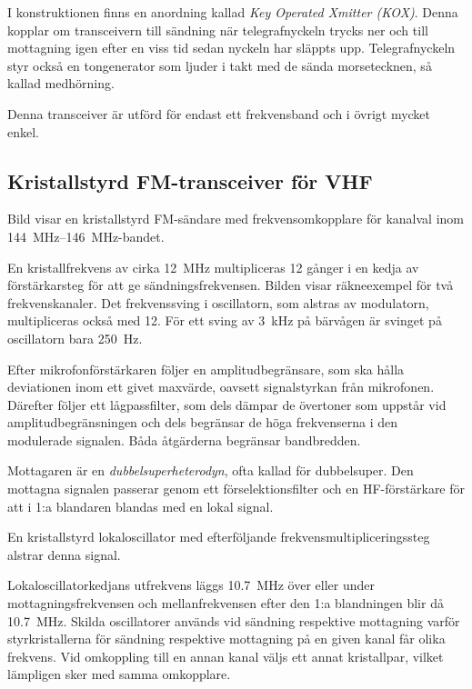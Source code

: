 I konstruktionen finns en anordning kallad \emph{Key Operated Xmitter (KOX)}.
Denna kopplar om transceivern till sändning när telegrafnyckeln trycks ner och
till mottagning igen efter en viss tid sedan nyckeln har släppts upp.
Telegrafnyckeln styr också en tongenerator som ljuder i takt med de sända
morsetecknen, så kallad medhörning.

Denna transceiver är utförd för endast ett frekvensband och i övrigt
mycket enkel.

\subsection{Kristallstyrd FM-transceiver för VHF}

Bild  visar en kristallstyrd FM-sändare med
frekvensomkopplare för kanalval inom \SIrange{144}{146}{\mega\hertz}-bandet.

En kristallfrekvens av cirka \qty{12}{\mega\hertz} multipliceras 12 gånger i en
kedja av förstärkarsteg för att ge sändningsfrekvensen.
Bilden visar räkneexempel för två frekvenskanaler.
Det frekvenssving i oscillatorn, som alstras av modulatorn,
multipliceras också med 12.
För ett sving av \qty{3}{\kilo\hertz} på bärvågen är svinget på oscillatorn bara
\qty{250}{\hertz}.

Efter mikrofonförstärkaren följer en amplitudbegränsare, som ska
hålla deviationen inom ett givet maxvärde, oavsett signalstyrkan från
mikrofonen.
Därefter följer ett lågpassfilter, som dels dämpar de övertoner som
uppstår vid amplitudbegränsningen och dels begränsar de höga frekvenserna
i den modulerade signalen.
Båda åtgärderna begränsar bandbredden.

Mottagaren är en \emph{dubbelsuperheterodyn}, ofta kallad för dubbelsuper.
Den mottagna signalen passerar genom ett förselektionsfilter och en
HF-förstärkare för att i 1:a blandaren blandas med en lokal signal.


En kristallstyrd lokaloscillator med efterföljande
frekvensmultipliceringssteg alstrar denna signal.

Lokaloscillatorkedjans utfrekvens läggs \qty{10,7}{\mega\hertz} över eller under
mottagningsfrekvensen och mellanfrekvensen efter den 1:a blandningen blir då
\qty{10,7}{\mega\hertz}.
Skilda oscillatorer används vid sändning respektive mottagning varför
styrkristallerna för sändning respektive mottagning på en given kanal får
olika frekvens.
Vid omkoppling till en annan kanal väljs ett annat kristallpar, vilket
lämpligen sker med samma omkopplare.

